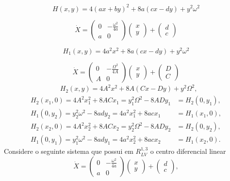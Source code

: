 $$H(x, y) = 4(ax+by)^2 +8a(cx−dy) +y^2\omega^2
$$

$$
\dot{X}=\left(\begin{array}{cc}
0 & -\frac{\omega^{2}}{4a} \\
a & 0
\end{array}\right)\left(\begin{array}{l}
x \\
y
\end{array}\right)+\left(\begin{array}{l}
d \\
c
\end{array}\right)
$$

$$H_1(x, y) = 4a^2 x^2 +8a(cx−dy) +y^2\omega^2
$$

$$
\dot{X}=\left(\begin{array}{cc}
0 & -\frac{\Omega^{2}}{4A} \\
A & 0
\end{array}\right)\left(\begin{array}{l}
x \\
y
\end{array}\right)+\left(\begin{array}{l}
D \\
C
\end{array}\right)
$$
\begin{align}
\label{integral_cruz}
&H_2(x, y) = 4A^2 x^2 +8A(Cx−Dy) +y^2\Omega^2,
\end{align}
\begin{align*}
H_2(x_1, 0) = 4A^2 x_1^2 +8A Cx_1 = y_1^2\Omega^2-8ADy_1& =H_2(0, y_1),
\\H_1(0, y_2) = y_2^2\omega^2-8ady_2= 4a^2 x_1^2 +8acx_1&=H_1(x_1, 0),
\\H_2(x_2, 0) = 4A^2 x_2^2 +8ACx_2 = y_2^2\Omega^2-8ADy_2 &=H_2(0, y_2),
\\H_1(0, y_1) = y_1^2\omega^2-8ady_1= 4a^2 x_2^2 +8acx_2&=H_1(x_2, 0).
\end{align*}
Considere o seguinte sistema que possui em $R^{1,3}_{LV}$ o centro diferencial linear
\begin{equation}
\label{A1}
\dot{X}=\left(\begin{array}{cc}
0 & -\frac{\omega^{2}}{4a} \\
a & 0
\end{array}\right)\left(\begin{array}{l}
x \\
y
\end{array}\right)+\left(\begin{array}{l}
d \\
c
\end{array}\right),
\end{equation}
